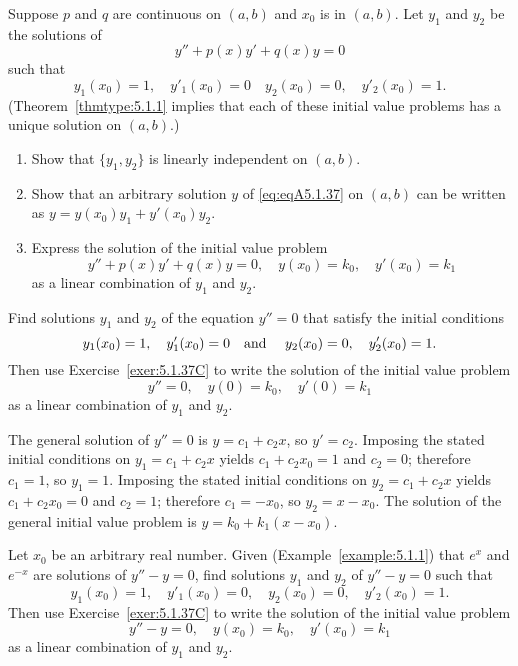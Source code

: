 \documentclass{ximera}
\begin{document}
\begin{problem}\label{exer:5.1.37}
Suppose  $p$ and $q$ are continuous  on  $(a,b)$ and
$x_0$ is in  $(a,b)$. Let $y_1$ and $y_2$ be the solutions of
\begin{equation}\label{eq:eqA5.1.37}
y''+p(x)y'+q(x)y=0
\end{equation}
 such that
$$
y_1(x_0)=1, \quad y'_1(x_0)=0 \quad
y_2(x_0)=0,\quad  y'_2(x_0)=1.
$$
(Theorem~\ref{thmtype:5.1.1} implies that each of these initial value
problems
has a unique solution on $(a,b)$.)
\begin{enumerate}
\item %
Show that  $\{y_1,y_2\}$ is linearly independent on  $(a,b)$.
\item %
Show that an arbitrary solution  $y$  of
\ref{eq:eqA5.1.37} on  $(a,b)$ can be written as
$y=y(x_0)y_1+y'(x_0)y_2$.
\item\label{exer:5.1.37C} %
Express the solution of the initial value problem
$$
y''+p(x)y'+q(x)y=0,\quad y(x_0)=k_0,\quad y'(x_0)=k_1
$$
as a linear combination of $y_1$ and $y_2$.
\end{enumerate}
\end{problem}

\begin{problem}\label{exer:5.1.38}
Find solutions $y_1$ and $y_2$ of the equation $y''=0$ that satisfy the
initial conditions
$$
y_1(x_0)=1, \quad y'_1(x_0)=0 \mbox{\quad and \quad} y_2(x_0)=0,
\quad y'_2(x_0)=1.
$$
Then use  Exercise~\ref{exer:5.1.37C} to write
the solution of  the initial value problem
$$
y''=0,\quad y(0)=k_0,\quad y'(0)=k_1
$$
as a linear combination of $y_1$ and $y_2$.

\begin{solution}
    The general solution of $y''=0$ is $y=c_1+c_2x$, so $y'=c_2$. Imposing
the stated initial conditions on $y_1=c_1+c_2x$  yields $c_1+c_2x_0=1$
and $c_2=0$; therefore $c_1=1$, so $y_1=1$.
Imposing the stated initial conditions on $y_2=c_1+c_2x$  yields
$c_1+c_2x_0=0$ and $c_2=1$; therefore $c_1=-x_0$, so $y_2=x-x_0$.
The solution of the general initial value problem is
$y=k_0+k_1(x-x_0)$.

\end{solution}
\end{problem}

\begin{problem}\label{exer:5.1.39}
Let $x_0$ be an arbitrary real number. Given (Example~\ref{example:5.1.1})
that $e^x$ and $e^{-x}$ are solutions of $y''-y=0$, find
solutions
$y_1$ and $y_2$ of $y''-y=0$ such that
$$
y_1(x_0)=1, \quad y'_1(x_0)=0, \quad  
y_2(x_0)=0,\quad  y'_2(x_0)=1.
$$
Then use  Exercise~\ref{exer:5.1.37C} to write
the solution of the initial value problem
$$
y''-y=0,\quad y(x_0)=k_0,\quad y'(x_0)=k_1
$$
as a linear combination of $y_1$ and $y_2$.
\end{problem}
\end{document}
